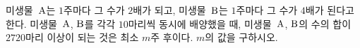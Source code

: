 미생물~$\mathrm{A}$는 $1$주마다 그 수가 $2$배가 되고, 미생물~$\mathrm{B}$는 $1$주마다 그 수가 $4$배가 된다고 한다. 미생물~$\mathrm{A}$, $\mathrm{B}$를 각각 $10$마리씩 동시에 배양했을 때, 미생물~$\mathrm{A}$, $\mathrm{B}$의 수의 합이 $2720$마리 이상이 되는 것은 최소 $m$주 후이다. $m$의 값을 구하시오.
